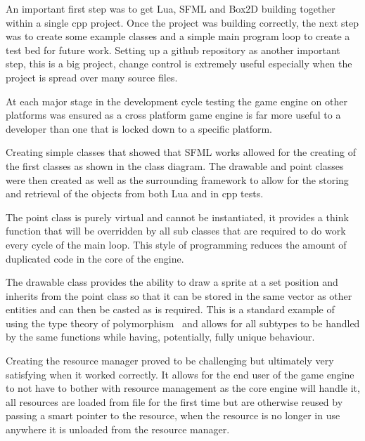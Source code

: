 \documentclass[11pt,a4paper,titlepage]{report}
\begin{document}
    
    An important first step was to get Lua, SFML and Box2D building together within a single cpp project. Once the project was building correctly, the next step was to create some example classes and a simple main program loop to create a test bed for future work. Setting up a github repository as another important step, this is a big project, change control is extremely useful especially when the project is spread over many source files.

    At each major stage in the development cycle testing the game engine on other platforms was ensured as a cross platform game engine is far more useful to a developer than one that is locked down to a specific platform.

    
    Creating simple classes that showed that SFML works allowed for the creating of the first classes as shown in the class diagram. The drawable and point classes were then created as well as the surrounding framework to allow for the storing and retrieval of the objects from both Lua and in cpp tests.

    The point class is purely virtual and cannot be instantiated, it provides a think function that will be overridden by all sub classes that are required to do work every cycle of the main loop. This style of programming reduces the amount of duplicated code in the core of the engine.

    The drawable class provides the ability to draw a sprite at a set position and inherits from the point class so that it can be stored in the same vector as other entities and can then be casted as is required. This is a standard example of using the type theory of polymorphism~\cite{PolymorphismDef} and allows for all subtypes to be handled by the same functions while having, potentially, fully unique behaviour.
	

	Creating the resource manager proved to be challenging but ultimately very satisfying when it worked correctly. It allows for the end user of the game engine to not have to bother with resource management as the core engine will handle it, all resources are loaded from file for the first time but are otherwise reused by passing a smart pointer to the resource, when the resource is no longer in use anywhere it is unloaded from the resource manager.
	
\end{document}
